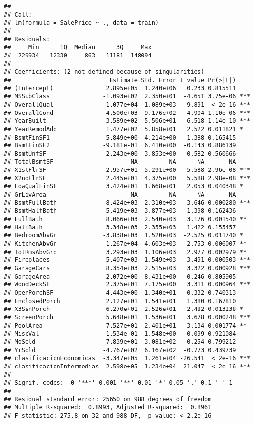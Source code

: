 \documentclass[
]{article}
\begin{document}
\begin{verbatim}
## 
## Call:
## lm(formula = SalePrice ~ ., data = train)
## 
## Residuals:
##     Min      1Q  Median      3Q     Max 
## -229934  -12330    -863   11181  148094 
## 
## Coefficients: (2 not defined because of singularities)
##                            Estimate Std. Error t value Pr(>|t|)    
## (Intercept)               2.895e+05  1.240e+06   0.233 0.815511    
## MSSubClass               -1.093e+02  2.350e+01  -4.651 3.75e-06 ***
## OverallQual               1.077e+04  1.089e+03   9.891  < 2e-16 ***
## OverallCond               4.500e+03  9.176e+02   4.904 1.10e-06 ***
## YearBuilt                 3.589e+02  5.506e+01   6.518 1.14e-10 ***
## YearRemodAdd              1.477e+02  5.858e+01   2.522 0.011821 *  
## BsmtFinSF1                5.849e+00  4.214e+00   1.388 0.165415    
## BsmtFinSF2               -9.181e-01  6.410e+00  -0.143 0.886139    
## BsmtUnfSF                 2.243e+00  3.853e+00   0.582 0.560666    
## TotalBsmtSF                      NA         NA      NA       NA    
## X1stFlrSF                 2.957e+01  5.291e+00   5.588 2.96e-08 ***
## X2ndFlrSF                 2.445e+01  4.375e+00   5.588 2.98e-08 ***
## LowQualFinSF              3.424e+01  1.668e+01   2.053 0.040348 *  
## GrLivArea                        NA         NA      NA       NA    
## BsmtFullBath              8.424e+03  2.310e+03   3.646 0.000280 ***
## BsmtHalfBath              5.419e+03  3.877e+03   1.398 0.162436    
## FullBath                  8.066e+03  2.540e+03   3.176 0.001540 ** 
## HalfBath                  3.348e+03  2.355e+03   1.422 0.155457    
## BedroomAbvGr             -3.838e+03  1.520e+03  -2.525 0.011740 *  
## KitchenAbvGr             -1.267e+04  4.603e+03  -2.753 0.006007 ** 
## TotRmsAbvGrd              3.293e+03  1.106e+03   2.977 0.002979 ** 
## Fireplaces                5.407e+03  1.549e+03   3.491 0.000503 ***
## GarageCars                8.354e+03  2.515e+03   3.322 0.000928 ***
## GarageArea                2.072e+00  8.431e+00   0.246 0.805905    
## WoodDeckSF                2.375e+01  7.175e+00   3.311 0.000964 ***
## OpenPorchSF              -4.443e+00  1.340e+01  -0.332 0.740313    
## EnclosedPorch             2.127e+01  1.541e+01   1.380 0.167810    
## X3SsnPorch                6.270e+01  2.526e+01   2.482 0.013238 *  
## ScreenPorch               5.648e+01  1.536e+01   3.678 0.000248 ***
## PoolArea                 -7.527e+01  2.401e+01  -3.134 0.001774 ** 
## MiscVal                   1.534e-01  1.548e+00   0.099 0.921084    
## MoSold                    7.839e+01  3.081e+02   0.254 0.799212    
## YrSold                   -4.767e+02  6.167e+02  -0.773 0.439739    
## clasificacionEconomicas  -3.347e+05  1.261e+04 -26.541  < 2e-16 ***
## clasificacionIntermedias -2.598e+05  1.234e+04 -21.047  < 2e-16 ***
## ---
## Signif. codes:  0 '***' 0.001 '**' 0.01 '*' 0.05 '.' 0.1 ' ' 1
## 
## Residual standard error: 25650 on 988 degrees of freedom
## Multiple R-squared:  0.8993, Adjusted R-squared:  0.8961 
## F-statistic: 275.8 on 32 and 988 DF,  p-value: < 2.2e-16
\end{verbatim}
\end{document}
